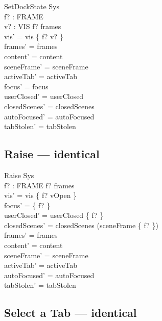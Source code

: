 \documentclass[a4paper,10pt,fleqn]{article}
\begin{document}
\begin{schema}{SetDockState}
  \Delta Sys \\
  f? : FRAME \\
  v? : VIS
\where
  f? \in frames \\
  vis' = vis \oplus \{ f? \mapsto v? \} \\
  frames' = frames \\
  content' = content \\
  sceneFrame' = sceneFrame \\
  activeTab' = activeTab \\
  focus' = focus \\
  userClosed' = userClosed \\
  closedScenes' = closedScenes \\
  autoFocused' = autoFocused \\
  tabStolen' = tabStolen
\end{schema}

\subsection{Raise --- identical}

\begin{schema}{Raise}
  \Delta Sys \\
  f? : FRAME
\where
  f? \in frames \\
  vis' = vis \oplus \{ f? \mapsto vOpen \} \\
  focus' = \{ f? \} \\
  userClosed' = userClosed \setminus \{ f? \} \\
  closedScenes' = closedScenes \setminus \dom (sceneFrame \rres \{ f? \}) \\
  frames' = frames \\
  content' = content \\
  sceneFrame' = sceneFrame \\
  activeTab' = activeTab \\
  autoFocused' = autoFocused \\
  tabStolen' = tabStolen
\end{schema}

\subsection{Select a Tab --- identical}
\end{document}
